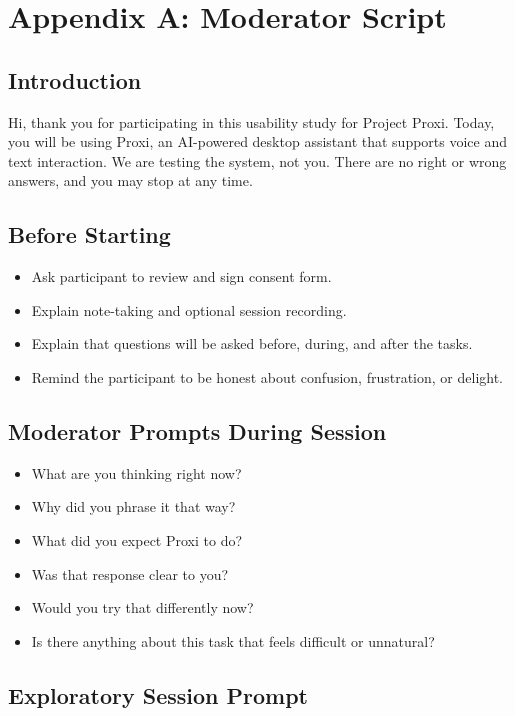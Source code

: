 \documentclass[12pt, titlepage]{article}
\begin{document}
\section{Appendix A: Moderator Script}

\subsection{Introduction}

Hi, thank you for participating in this usability study for Project
Proxi. Today, you will be using Proxi, an AI-powered desktop assistant
that supports voice and text interaction. We are testing the system, not
you. There are no right or wrong answers, and you may stop at any time.

\subsection{Before Starting}

\begin{itemize}
    \item Ask participant to review and sign consent form.
    \item Explain note-taking and optional session recording.
    \item Explain that questions will be asked before, during, and after
    the tasks.
    \item Remind the participant to be honest about confusion,
    frustration, or delight.
\end{itemize}

\subsection{Moderator Prompts During Session}

\begin{itemize}
    \item What are you thinking right now?
    \item Why did you phrase it that way?
    \item What did you expect Proxi to do?
    \item Was that response clear to you?
    \item Would you try that differently now?
    \item Is there anything about this task that feels difficult or
    unnatural?
\end{itemize}

\subsection{Exploratory Session Prompt}
\end{document}
